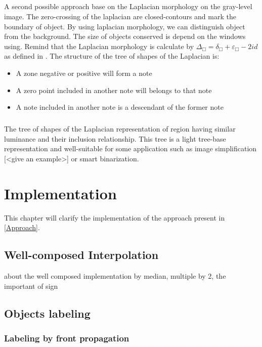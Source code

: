\documentclass[12pt,a4paper]{report}
\begin{document}
\paragraph{}
A second possible approach base on the Laplacian morphology on the gray-level image. The zero-crossing of the laplacian are closed-contours and mark the boundary of object. By using laplacian morphology, we can distinguish object from the background. The size of objects conserved is depend on the windows using. Remind that the Laplacian morphology is calculate by $ \Delta_\Box = \delta_\Box + \varepsilon_\Box -2id $ as defined in \cite{Vliet_anedge}. The structure of the tree of shapes of the Laplacian is:
\begin{itemize}
\item A zone negative or positive will form a note
\item A zero point included in another note will belongs to that note
\item A note included in another note is a descendant of the former note
\end{itemize}
\paragraph{}
The tree of shapes of the Laplacian representation of region having similar luminance and their inclusion relationship. This tree is a light tree-base representation and well-suitable for some application such as image simplification [<give an example>] or smart binarization. 

\chapter{Implementation}

This chapter will clarify the implementation of the approach present in \autoref{Approach}.

\section{Well-composed Interpolation}

about the well composed implementation by median, multiple by 2, the important of sign

\section{Objects labeling}

\subsection{Labeling by front propagation}
\end{document}
